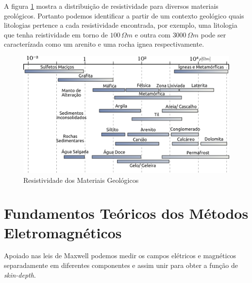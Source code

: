     A figura \ref{tabela_resistividade} mostra a distribuição de resistividade para diversos materiais geológicos. 
    Portanto podemos identificar a partir de um contexto geológico quais litologias pertence a cada resistividade encontrada, por exemplo, uma litologia que tenha reistividade em torno de  $100 \, \Omega m$ e outra com $3000 \, \Omega m $ pode ser caracterízada como um arenito e uma rocha ignea respectivamente. 
    
    \begin{figure}[h]
        \centering
        \caption{Resistividade dos Materiais Geológicos}
        \centerline{\includegraphics[width=14cm]{texto/fig/resistividade_tabela.png}}
        \label{tabela_resistividade}
    \end{figure}
    
    
    
    \section{Fundamentos Teóricos dos Métodos Eletromagnéticos}
        Apoiado nas leis de Maxwell \cite{eletromag8hayt} podemos medir os campos elétricos e magnéticos separadamente em diferentes componentes e assim unir para obter a função de \textit{skin-depth}.
	
